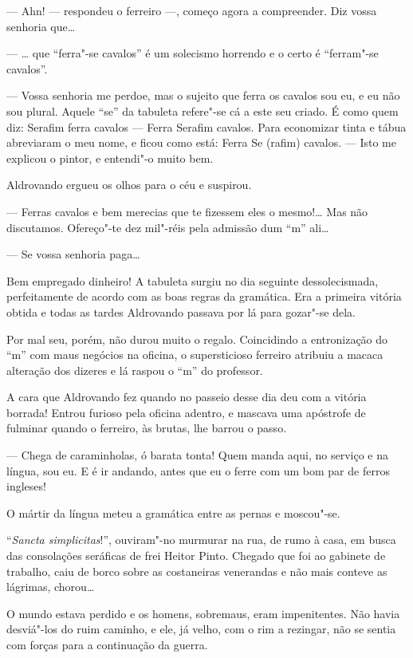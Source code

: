 --- Ahn! --- respondeu o ferreiro ---, começo agora a compreender. Diz
vossa senhoria que\ldots{}

--- \ldots{} que ``ferra"-se cavalos'' é um solecismo horrendo e o certo é
``ferram"-se cavalos''.

--- Vossa senhoria me perdoe, mas o sujeito que ferra os cavalos sou eu,
e eu não sou plural. Aquele ``se'' da tabuleta refere"-se cá a este seu
criado. É como quem diz: Serafim ferra cavalos --- Ferra Serafim
cavalos. Para economizar tinta e tábua abreviaram o meu nome, e ficou
como está: Ferra Se (rafim) cavalos. --- Isto me explicou o pintor, e
entendi"-o muito bem.

Aldrovando ergueu os olhos para o céu e suspirou.

--- Ferras cavalos e bem merecias que te fizessem eles o mesmo!\ldots{} Mas
não discutamos. Ofereço"-te dez mil"-réis pela admissão dum ``m'' ali\ldots{}

--- Se vossa senhoria paga\ldots{}

Bem empregado dinheiro! A tabuleta surgiu no dia seguinte
dessolecismada, perfeitamente de acordo com as boas regras da gramática.
Era a primeira vitória obtida e todas as tardes Aldrovando passava por
lá para gozar"-se dela.

Por mal seu, porém, não durou muito o regalo. Coincidindo a entronização
do ``m'' com maus negócios na oficina, o supersticioso ferreiro atribuiu
a macaca alteração dos dizeres e lá raspou o ``m'' do professor.

A cara que Aldrovando fez quando no passeio desse dia deu com a vitória
borrada! Entrou furioso pela oficina adentro, e mascava uma apóstrofe de
fulminar quando o ferreiro, às brutas, lhe barrou o passo.

--- Chega de caraminholas, ó barata tonta! Quem manda aqui, no serviço e
na língua, sou eu. E é ir andando, antes que eu o ferre com um bom par
de ferros ingleses!

O mártir da língua meteu a gramática entre as pernas e moscou"-se.

``\emph{Sancta simplicitas}!'', ouviram"-no murmurar na rua, de rumo à
casa, em busca das consolações seráficas de frei Heitor Pinto. Chegado
que foi ao gabinete de trabalho, caiu de borco sobre as costaneiras
venerandas e não mais conteve as lágrimas, chorou\ldots{}

O mundo estava perdido e os homens, sobremaus, eram impenitentes. Não
havia desviá"-los do ruim caminho, e ele, já velho, com o rim a rezingar,
não se sentia com forças para a continuação da guerra.

